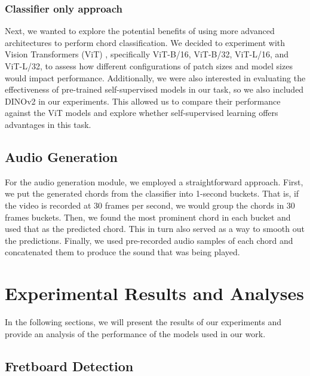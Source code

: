 \documentclass[10pt,twocolumn,letterpaper]{article}
\begin{document}

\subsubsection{Classifier only approach}
Next, we wanted to explore the potential benefits of using more advanced architectures to perform chord classification. We decided to experiment with Vision Transformers (ViT) \cite{dosovitskiy2020image}, specifically ViT-B/16, ViT-B/32, ViT-L/16, and ViT-L/32, to assess how different configurations of patch sizes and model sizes would impact performance. Additionally, we were also interested in evaluating the effectiveness of pre-trained self-supervised models in our task, so we also included DINOv2 \cite{oquab2023dinov2} in our experiments. This allowed us to compare their performance against the ViT models and explore whether self-supervised learning offers advantages in this task.

\subsection{Audio Generation}
For the audio generation module, we employed a straightforward approach. First, we put the generated chords from the classifier into 1-second buckets. That is, if the video is recorded at 30 frames per second, we would group the chords in 30 frames buckets. Then, we found the most prominent chord in each bucket and used that as the predicted chord. This in turn also served as a way to smooth out the predictions. Finally, we used pre-recorded audio samples of each chord and concatenated them to produce the sound that was being played.

\section{Experimental Results and Analyses}
\label{sec:results}

In the following sections, we will present the results of our experiments and provide an analysis of the performance of the models used in our work.

\subsection{Fretboard Detection}
\end{document}
